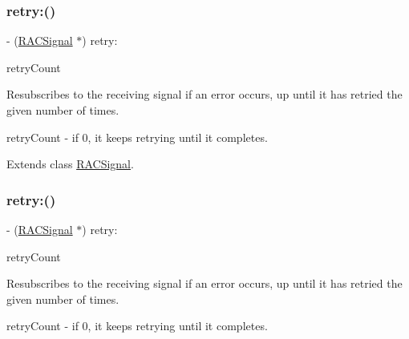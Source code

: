 \mbox{\label{category_r_a_c_signal_07_operations_08_a3601540c46ceb34dbd1c242782022809}} 
\subsubsection{\texorpdfstring{retry\+:()}{retry:()}\hspace{0.1cm}{\footnotesize\ttfamily [2/3]}}
{\footnotesize\ttfamily -\/ (\mbox{\hyperlink{interface_r_a_c_signal}{R\+A\+C\+Signal}} $\ast$) retry\+: \begin{DoxyParamCaption}\item[{(N\+S\+Integer)}]{retry\+Count }\end{DoxyParamCaption}}

Resubscribes to the receiving signal if an error occurs, up until it has retried the given number of times.

retry\+Count -\/ if 0, it keeps retrying until it completes. 

Extends class \mbox{\hyperlink{interface_r_a_c_signal_a3601540c46ceb34dbd1c242782022809}{R\+A\+C\+Signal}}.

\mbox{\label{category_r_a_c_signal_07_operations_08_a3601540c46ceb34dbd1c242782022809}} 
\subsubsection{\texorpdfstring{retry\+:()}{retry:()}\hspace{0.1cm}{\footnotesize\ttfamily [3/3]}}
{\footnotesize\ttfamily -\/ (\mbox{\hyperlink{interface_r_a_c_signal}{R\+A\+C\+Signal}} $\ast$) retry\+: \begin{DoxyParamCaption}\item[{(N\+S\+Integer)}]{retry\+Count }\end{DoxyParamCaption}}

Resubscribes to the receiving signal if an error occurs, up until it has retried the given number of times.

retry\+Count -\/ if 0, it keeps retrying until it completes. 

